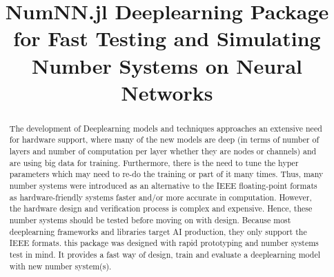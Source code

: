 \documentclass[onecolumn,draftcls,12pt,conference]{IEEEtran}
\title{NumNN.jl Deeplearning Package for Fast Testing and Simulating Number Systems on Neural Networks}
\author{\IEEEauthorblockN{Mohammad~Hizzani} \IEEEauthorblockA{University of Lisbon\\
		Email: \href{mailto:moh.hizzani@gmail.com}{moh.hizzani@gmail.com}}
}
\begin{document}
	\maketitle

	\begin{abstract}
		The development of Deeplearning models and techniques approaches an extensive need for hardware support, where many of the new models are deep (in terms of number of layers and number of computation per layer whether they are nodes or channels) and are using big data for training. Furthermore, there is the need to tune the hyper parameters which may need to re-do the training or part of it many times. Thus, many number systems were introduced as an alternative to the IEEE floating-point formats as hardware-friendly systems faster and/or more accurate in computation. However, the hardware design and verification process is complex and expensive. Hence, these number systems should be tested before moving on with design. Because most deeplearning frameworks and libraries target AI production, they only support the IEEE formats. this package was designed with rapid prototyping and number systems test in mind. It provides a fast way of design, train and evaluate a deeplearning model with new number system(s).
	\end{abstract}

	
	
	
	
	
%	
	
	
	
\end{document}
